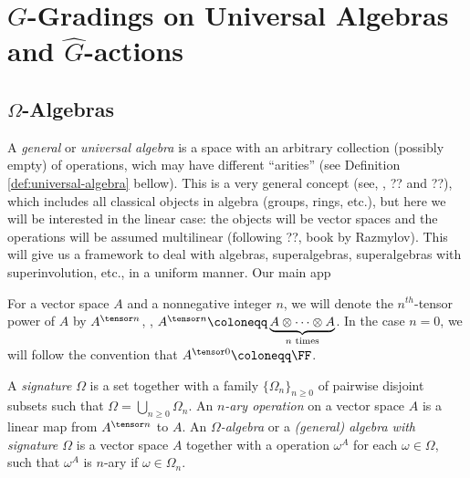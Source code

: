 \chapter{$G$-Gradings on Universal Algebras and $\widehat G$-actions}

\section{$\Omega$-Algebras}

A \emph{general} or \emph{universal algebra} is a space with an arbitrary collection (possibly empty) of operations, wich may have different ``arities'' (see Definition \ref{def:universal-algebra} bellow).
This is a very general concept (see, \eg, ?? and ??), which includes all classical objects in algebra (groups, rings, etc.), but here we will be interested in the linear case: the objects will be vector spaces and the operations will be assumed multilinear (following ??, book by Razmylov).
This will give us a framework to deal with algebras, superalgebras, superalgebras with superinvolution, etc., in a uniform manner.
Our main app

\begin{notation}
	For a vector space $A$ and a nonnegative integer $n$, we will denote the $n^{th}$-tensor power of $A$ by $A^{\tensor n}$, \ie,
	$A^{\tensor n} \coloneqq \underbrace{A\otimes\cdots\otimes A}_{n \text{ times}}$.
	In the case $n = 0$, we will follow the convention that $A^{\tensor 0} \coloneqq \FF$.
\end{notation}

\begin{defi}\label{def:universal-algebra}
	A \emph{signature} $\Omega$ is a set together with a family $\{ \Omega_n \}_{n \geq 0}$ of pairwise disjoint subsets such that $\Omega = \bigcup_{n \geq 0} \Omega_n$.
	An \emph{$n$-ary operation} on a vector space $A$ is a linear map from $A^{\tensor n}$ to $A$.
	An \emph{$\Omega$-algebra} or a \emph{(general) algebra with signature $\Omega$} is a vector space $A$ together with a operation $\omega^A$ for each $\omega \in \Omega$, such that $\omega^A$ is $n$-ary if $\omega \in \Omega_n$.
\end{defi}


